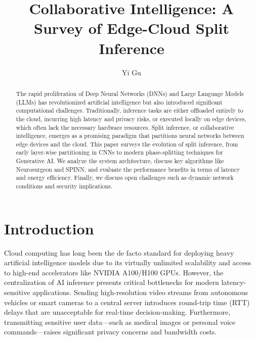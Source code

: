\documentclass[runningheads]{llncs}
\begin{document}
%
\title{Collaborative Intelligence: A Survey of Edge-Cloud Split Inference}
%
\author{Yi Gu}
%
\maketitle              %
%
\begin{abstract}
The rapid proliferation of Deep Neural Networks (DNNs) and Large Language Models (LLMs) has revolutionized artificial intelligence but also introduced significant computational challenges. Traditionally, inference tasks are either offloaded entirely to the cloud, incurring high latency and privacy risks, or executed locally on edge devices, which often lack the necessary hardware resources. Split inference, or collaborative intelligence, emerges as a promising paradigm that partitions neural networks between edge devices and the cloud. This paper surveys the evolution of split inference, from early layer-wise partitioning in CNNs to modern phase-splitting techniques for Generative AI. We analyze the system architecture, discuss key algorithms like Neurosurgeon and SPINN, and evaluate the performance benefits in terms of latency and energy efficiency. Finally, we discuss open challenges such as dynamic network conditions and security implications.

\end{abstract}
%
\section{Introduction}
Cloud computing has long been the de facto standard for deploying heavy artificial intelligence models due to its virtually unlimited scalability and access to high-end accelerators like NVIDIA A100/H100 GPUs. However, the centralization of AI inference presents critical bottlenecks for modern latency-sensitive applications. Sending high-resolution video streams from autonomous vehicles or smart cameras to a central server introduces round-trip time (RTT) delays that are unacceptable for real-time decision-making. Furthermore, transmitting sensitive user data—such as medical images or personal voice commands—raises significant privacy concerns and bandwidth costs.
\end{document}
